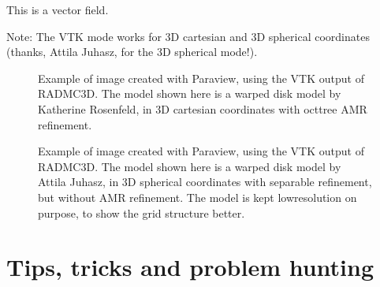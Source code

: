\documentclass[letterpaper,10pt,english]{sphinxmanual}
\begin{document}
\begin{sphinxVerbatim}[commandchars=\\\{\}]
 
\end{sphinxVerbatim}

This is a vector field.

Note: The VTK mode works for 3\sphinxhyphen{}D cartesian and 3\sphinxhyphen{}D spherical coordinates
(thanks, Attila Juhasz, for the 3\sphinxhyphen{}D spherical mode!).

\begin{figure}[htbp]
\centering
\capstart

\noindent{}
\caption{Example of image created with Paraview, using the VTK output of RADMC\sphinxhyphen{}3D.
The model shown here is a warped disk model by Katherine Rosenfeld, in 3\sphinxhyphen{}D
cartesian coordinates with oct\sphinxhyphen{}tree AMR refinement.}\label{\detokenize{vtkoutput:id1}}\label{\detokenize{vtkoutput:fig-disk-with-vtk}}\end{figure}

\begin{figure}[htbp]
\centering
\capstart

\noindent{}
\caption{Example of image created with Paraview, using the VTK output of RADMC\sphinxhyphen{}3D.
The model shown here is a warped disk model by Attila Juhasz, in 3\sphinxhyphen{}D
spherical coordinates with separable refinement, but without AMR refinement.
The model is kept low\sphinxhyphen{}resolution on purpose, to show the grid structure
better.}\label{\detokenize{vtkoutput:id2}}\label{\detokenize{vtkoutput:fig-modeljuhasz-with-vtk}}\end{figure}


\chapter{Tips, tricks and problem hunting}
\label{\detokenize{tipsandtricks:tips-tricks-and-problem-hunting}}\label{\detokenize{tipsandtricks:chap-problem-hunting}}\label{\detokenize{tipsandtricks::doc}}
\end{document}
